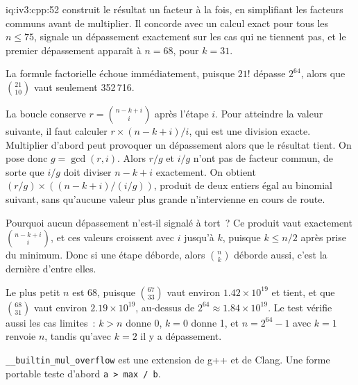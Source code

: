 \begin{solution}{iq:iv3:cpp:52}
 construit le résultat un facteur à la fois, en simplifiant les facteurs communs avant de multiplier. Il concorde avec un calcul exact pour tous les $n \le 75$, signale un dépassement exactement sur les cas qui ne tiennent pas, et le premier dépassement apparaît à $n = 68$, pour $k = 31$.
\label{lst:iv3:cp:choose}

La formule factorielle échoue immédiatement, puisque $21!$ dépasse $2^{64}$, alors que $\binom{21}{10}$ vaut seulement 352\,716.

La boucle conserve $r = \binom{n - k + i}{i}$ après l'étape $i$. Pour atteindre la valeur suivante, il faut calculer $r \times (n - k + i) / i$, qui est une division exacte. Multiplier d'abord peut provoquer un dépassement alors que le résultat tient. On pose donc $g = \gcd(r, i)$. Alors $r / g$ et $i / g$ n'ont pas de facteur commun, de sorte que $i / g$ doit diviser $n - k + i$ exactement. On obtient $(r / g) \times ((n - k + i) / (i / g))$, produit de deux entiers égal au binomial suivant, sans qu'aucune valeur plus grande n'intervienne en cours de route.

Pourquoi aucun dépassement n'est-il signalé à tort~? Ce produit vaut exactement $\binom{n - k + i}{i}$, et ces valeurs croissent avec $i$ jusqu'à $k$, puisque $k \le n / 2$ après prise du minimum. Donc si une étape déborde, alors $\binom{n}{k}$ déborde aussi, c'est la dernière d'entre elles.

Le plus petit $n$ est 68, puisque $\binom{67}{33}$ vaut environ $1.42 \times 10^{19}$ et tient, et que $\binom{68}{31}$ vaut environ $2.19 \times 10^{19}$, au-dessus de $2^{64} \approx 1.84 \times 10^{19}$. Le test vérifie aussi les cas limites~: $k > n$ donne 0, $k = 0$ donne 1, et $n = 2^{64} - 1$ avec $k = 1$ renvoie $n$, tandis qu'avec $k = 2$ il y a dépassement.

\texttt{\_\_builtin\_mul\_overflow} est une extension de g++ et de Clang. Une forme portable teste d'abord \texttt{a > max / b}.

\end{solution}

